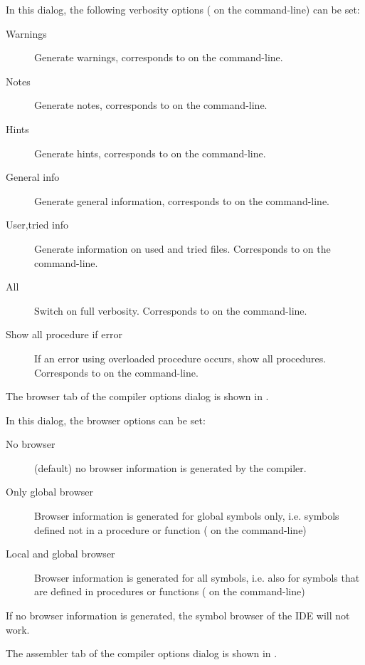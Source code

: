 
In this dialog, the following verbosity options ( on the
command-line) can be set:
\begin{description}
\item[Warnings] Generate warnings, corresponds to  on the
command-line.
\item[Notes] Generate notes, corresponds to  on the
command-line.
\item[Hints] Generate hints, corresponds to  on the
command-line.
\item[General info] Generate general information, corresponds to  on the
command-line.
\item[User,tried info] Generate information on used and tried files. Corresponds to  on the
command-line.
\item[All] Switch on full verbosity. Corresponds to  on the
command-line.
\item[Show all procedure if error] If an error using overloaded procedure
occurs, show all procedures. Corresponds to  on the
command-line.
\end{description}
The browser tab of the compiler options dialog is shown in
.


In this dialog, the browser options can be set:
\begin{description}
\item[No browser] (default) no browser information is generated by the
compiler.
\item[Only global browser] Browser information is generated for global
symbols only, i.e. symbols defined not in a procedure or function ( on the command-line)
\item[Local and global browser]  Browser information is generated for all
symbols, i.e. also for symbols that are defined in procedures or functions
 ( on the command-line)
\end{description}
\begin{remark}
If no browser information is generated, the symbol browser of the IDE will
not work.
\end{remark}
The assembler tab of the compiler options dialog is shown in
.



